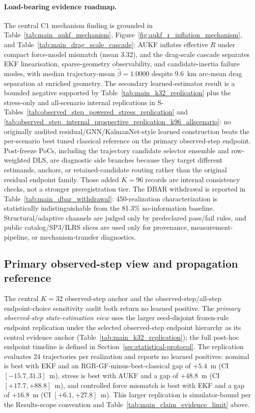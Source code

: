 \documentclass{article}
\begin{document}
\paragraph{Load-bearing evidence roadmap.}
The central C1 mechanism finding is grounded in Table~\ref{tab:main_aukf_mechanism}, Figure~\ref{fig:aukf_r_inflation_mechanism}, and Table~\ref{tab:main_drag_scale_cascade}: AUKF inflates effective \(R\) under compact force-model mismatch (mean 3.32), and the drag-scale cascade separates EKF linearisation, sparse-geometry observability, and candidate-inertia failure modes, with median trajectory-mean $\hat{\beta}=1.0000$ despite 9.6~km arc-mean drag separation at enriched geometry. The secondary learned-estimator result is a bounded negative supported by Table~\ref{tab:main_k32_replication} plus the stress-only and all-scenario internal replications in S-Tables~\ref{tab:observed_step_powered_stress_replication} and \ref{tab:observed_step_internal_prospective_replication_k96_allscenario}: no originally audited residual/GNN/KalmanNet-style learned construction beats the per-scenario best tuned classical reference on the primary observed-step endpoint. Post-freeze PoCs, including the trajectory candidate selector ensemble and row-weighted DLS, are diagnostic side branches because they target different estimands, anchors, or retained-candidate routing rather than the original residual endpoint family. Those added $K=96$ records are internal consistency checks, not a stronger preregistration tier. The DBAR withdrawal is reported in Table~\ref{tab:main_dbar_withdrawal}: 450-realization characterization is statistically indistinguishable from the 81.3\% no-information baseline. Structural/adaptive channels are judged only by predeclared pass/fail rules, and public catalog/SP3/ILRS slices are used only for provenance, measurement-pipeline, or mechanism-transfer diagnostics.



\subsection{Primary observed-step view and propagation reference}
The central $K=32$ observed-step anchor and the observed-step/all-step endpoint-choice sensitivity audit both return no learned positive.
The \emph{primary observed-step state-estimation view} uses the larger seed-disjoint frozen-rule endpoint replication under the selected observed-step endpoint hierarchy as its central evidence anchor (Table~\ref{tab:main_k32_replication}); the full post-hoc endpoint timeline is defined in Section~\ref{sec:statistical-protocol}. The replication evaluates 24 trajectories per realization and reports no learned positives: nominal is best with EKF and an RGR-GF-minus-best-classical gap of $+5.4$~m (CI $[-15.7,31.3]$~m), stress is best with AUKF and a gap of $+48.8$~m (CI $[+17.7,+88.8]$~m), and controlled force mismatch is best with EKF and a gap of $+16.8$~m (CI $[+6.1,+27.8]$~m). This larger replication is simulator-bound per the Results-scope convention and Table~\ref{tab:main_claim_evidence_limit} above.
\end{document}
